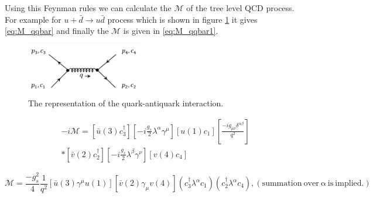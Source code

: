 Using this Feynman rules we can calculate the $\mathcal{M}$ of the tree level QCD process. For example for $u+\bar{d}\rightarrow u\bar{d}$ process which is shown in figure \ref{fig:qqbar_scatter} it gives \ref{eq:M_qqbar} and finally the $\mathcal{M}$ is given in \ref{eq:M_qqbar1}.


\begin{figure}[h!]
\begin{center}
\includegraphics[width=0.45\textwidth]{figures/theory/qqbar_scatter.png}
\caption{The representation of the quark-antiquark interaction.}
\label{fig:qqbar_scatter}
\end{center}
\end{figure}

\begin{equation}
\begin{split}
&-i\mathcal{M}=[\bar{u}(3)c_{3}^{\dag}][-i\frac{g_{s}}{2}\lambda^{\alpha}\gamma^{\mu}][u(1)c_{1}][\frac{-ig_{\mu\nu}\delta^{\alpha\beta}}{q^{2}}]\\
&*[\bar{v}(2)c_{2}^{\dag}][-i\frac{g_{s}}{2}\lambda^{\beta}\gamma^{\nu}][v(4)c_{4}]
\end{split}
\label{eq:M_qqbar}
\end{equation}

\begin{equation}
\mathcal{M}=\frac{-g_{s}^{2}}{4}\frac{1}{q^{2}}[\bar{u}(3)\gamma^{\mu}u(1)][\bar{v}(2)\gamma_{\mu}v(4)](c_{3}^{\dag}\lambda^{\alpha}c_{1})(c_{2}^{\dag}\lambda^{\alpha}c_{4}), \mathrm{(summation~over~\alpha~is~implied.)}
\label{eq:M_qqbar1}
\end{equation}





